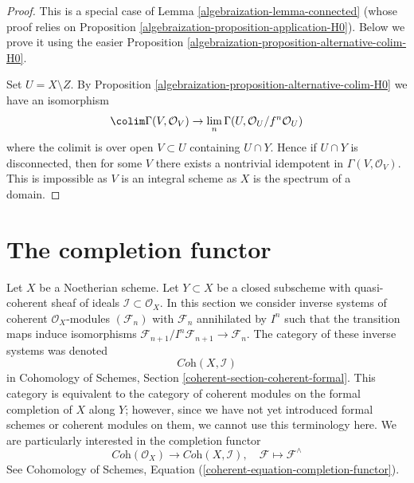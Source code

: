 \begin{proof}

This is a special case of Lemma \ref{algebraization-lemma-connected} (whose proof
relies on Proposition \ref{algebraization-proposition-application-H0}). Below we
prove it using the easier Proposition \ref{algebraization-proposition-alternative-colim-H0}.

\medskip\noindent
Set $U = X \setminus Z$. By Proposition \ref{algebraization-proposition-alternative-colim-H0}
we have an isomorphism
$$
\colim \Gamma(V, \mathcal{O}_V) \to
\lim_n \Gamma(U, \mathcal{O}_U/f^n \mathcal{O}_U)
$$
where the colimit is over open $V \subset U$ containing $U \cap Y$.
Hence if $U \cap Y$ is disconnected, then for some $V$ there exists
a nontrivial idempotent in $\Gamma(V, \mathcal{O}_V)$. This is impossible
as $V$ is an integral scheme as $X$ is the spectrum of a domain.
\end{proof}

\section{The completion functor}
\label{algebraization-section-completion}
Let $X$ be a Noetherian scheme. Let $Y \subset X$ be a closed subscheme
with quasi-coherent sheaf of ideals $\mathcal{I} \subset \mathcal{O}_X$.
In this section we consider inverse systems of coherent
$\mathcal{O}_X$-modules $(\mathcal{F}_n)$ with $\mathcal{F}_n$
annihilated by $I^n$ such that the transition maps induce
isomorphisms $\mathcal{F}_{n + 1}/I^n\mathcal{F}_{n + 1} \to \mathcal{F}_n$.
The category of these inverse systems was denoted
$$
\textit{Coh}(X, \mathcal{I})
$$
in Cohomology of Schemes, Section \ref{coherent-section-coherent-formal}.
This category is equivalent to the category of coherent modules
on the formal completion of $X$ along $Y$; however, since we have
not yet introduced formal schemes or coherent modules on them,
we cannot use this terminology here. We are particularly interested
in the completion functor
$$
\textit{Coh}(\mathcal{O}_X)
\longrightarrow
\textit{Coh}(X, \mathcal{I}),\quad
\mathcal{F} \longmapsto \mathcal{F}^\wedge
$$
See
Cohomology of Schemes, Equation (\ref{coherent-equation-completion-functor}).


